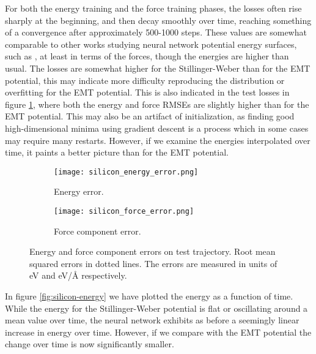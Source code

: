 For both the energy training and the force training phases, the 
losses often rise sharply at the beginning, and then decay smoothly over time,
reaching something of a convergence after approximately 500-1000 steps.
These values are somewhat comparable to other works studying neural network
potential energy surfaces, such as \cite{stende2017constructing,
treider2017speeding, khorshidi2016amp, PhysRevLett.120.143001},
at least in terms of the forces, though the energies are higher than usual.
The losses are somewhat higher for the Stillinger-Weber than for the
EMT potential, this may indicate more difficulty reproducing the distribution
or overfitting for the EMT potential.
This is also indicated in the test losses in figure \ref{fig:silicon-error},
where both the energy and force RMSEs are slightly higher than for the
EMT potential. This may also be an artifact of initialization, as finding
good high-dimensional minima using gradient descent 
is a process which in some cases may require many restarts.
However, if we examine the energies interpolated over time,
it paints a better picture than for the EMT potential.

\begin{figure}[H]
\begin{adjustbox}{max width=1.2\linewidth,center}
\centering
  \begin{subfigure}[b]{0.55\textwidth}
      \texttt{[image: silicon\_energy\_error.png]}
      \caption{Energy error.}
  \end{subfigure}
  \hfill
  \begin{subfigure}[b]{0.55\textwidth}
      \texttt{[image: silicon\_force\_error.png]}
      \caption{Force component error.}
  \end{subfigure}
\end{adjustbox}
    \caption{Energy and force component errors on test trajectory.
        Root mean squared errors in dotted lines.
        The errors are measured in units of eV and eV/Å respectively.}
    \label{fig:silicon-error}
\end{figure}

In figure \ref{fig:silicon-energy} we have plotted the energy as a function
of time. While the energy for the Stillinger-Weber potential 
is flat or oscillating around a mean value over time,
the neural network exhibits as before a seemingly
linear increase in energy over time.
However, if we compare with the EMT potential the change over time 
is now significantly smaller.

